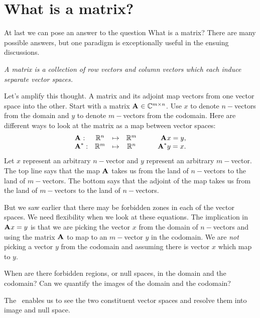 \section{What is a matrix?}
At last we can pose an answer to the question What is a matrix? There are many possible answers, but one paradigm is exceptionally useful in the ensuing discussions.

\textit{A matrix is a collection of row vectors and column vectors which each induce separate vector spaces.} 

Let's amplify this thought. A matrix and its adjoint map vectors from one vector space into the other. Start with a matrix $\textbf{A}^{\mathrm{}}\in\mathbb{C}^{m \times n}$. Use $x$ to denote $n-$vectors from the domain and $y$ to denote $m-$vectors from the codomain. Here are different ways to look at the matrix as a map between vector spaces:
\begin{equation}
\begin{array}{lcccr}
  \textbf{A}^{\mathrm{}}:  &\mathbb{R}^{n} & \mapsto & \mathbb{R}^{m} & \qquad \textbf{A}^{\mathrm{}}x=y,\\
  \textbf{A}^{\mathrm{*}}: &\mathbb{R}^{m} & \mapsto & \mathbb{R}^{n} & \qquad \textbf{A}^{\mathrm{*}}y=x.
\end{array}
\end{equation}
Let $x$ represent an arbitrary $n-$vector and $y$ represent an arbitrary $m-$vector. The top line says that the map $\textbf{A}^{\mathrm{}}$ takes us from the land of $n-$vectors to the land of $m-$vectors. The bottom says that the adjoint of the map takes us from the land of $m-$vectors to the land of $n-$vectors.

But we saw earlier that there may be forbidden zones in each of the vector spaces. We need flexibility when we look at these equations. The implication in $\textbf{A}^{\mathrm{}}x=y$ is that we are picking the vector $x$ from the domain of $n-$vectors and using the matrix $\textbf{A}^{\mathrm{}}$ to map to an $m-$vector $y$ in the codomain. We are \textit{not} picking a vector $y$ from the codomain and assuming there is vector $x$ which map to $y$.

When are there forbidden regions, or null spaces, in the domain and the codomain? Can we quantify the images of the domain and the codomain?

The \svdl \ enables us to see the two constituent vector spaces and resolve them into image and null space.

\endinput
